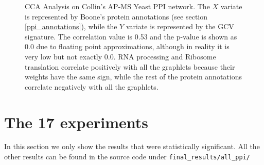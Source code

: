 \begin{figure}
\begin{subfigure}{.65\textwidth}
\begin{tabular}{ c c | c c }
  \end{tabular}

  \end{subfigure}
  \begin{subfigure}{.25\textwidth}
    \centering 
	
	
    \gtwo
    \geight
    \gtwentynine
    \gdots
    \gthirteen
    \gten
    \gnine
    
    
    


  \end{subfigure}
  
\caption[CCA Analysis on Collin's AP-MS Yeast PPI network.]{CCA Analysis on Collin's AP-MS Yeast PPI network. The $X$ variate is represented by Boone's protein annotations (see section \ref{ppi_annotations}), while the $Y$ variate is represented by the GCV signature. The correlation value is 0.53 and the p-value is shown as 0.0 due to floating point approximations, although in reality it is very low but not exactly 0.0. RNA processing and Ribosome translation correlate positively with all the graphlets because their weights have the same sign, while the rest of the protein annotations correlate negatively with all the graphlets.}
\label{yeast_apms_collins_cca}
\end{figure}


\section{The 17 experiments}

In this section we only show the results that were statistically significant. All the other results can be found in the source code under \lstinline|final_results/all_ppi/|



